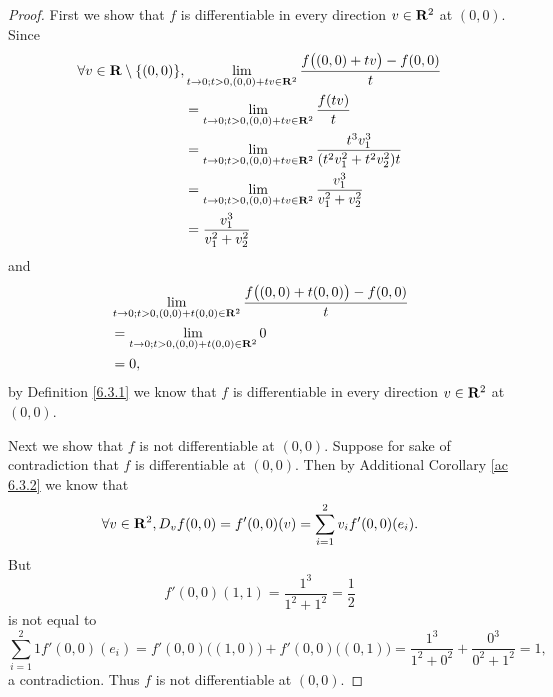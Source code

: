 \begin{proof}
    First we show that \(f\) is differentiable in every direction \(v \in \mathbf{R}^2\) at \((0, 0)\).
    Since
    \begin{align*}
        \forall v \in \mathbf{R} \setminus \{(0, 0)\}, & \lim_{t \to 0 ; t > 0, (0, 0) + tv \in \mathbf{R}^2} \frac{f\big((0, 0) + tv\big) - f(0, 0)}{t}    \\
                                               & = \lim_{t \to 0 ; t > 0, (0, 0) + tv \in \mathbf{R}^2} \frac{f(tv)}{t}                             \\
                                               & = \lim_{t \to 0 ; t > 0, (0, 0) + tv \in \mathbf{R}^2} \frac{t^3 v_1^3}{(t^2 v_1^2 + t^2 v_2^2) t} \\
                                               & = \lim_{t \to 0 ; t > 0, (0, 0) + tv \in \mathbf{R}^2} \frac{v_1^3}{v_1^2 + v_2^2}                 \\
                                               & = \frac{v_1^3}{v_1^2 + v_2^2}
    \end{align*}
    and
    \begin{align*}
         & \lim_{t \to 0 ; t > 0, (0, 0) + t (0, 0) \in \mathbf{R}^2} \frac{f\big((0, 0) + t(0, 0)\big) - f(0, 0)}{t} \\
         & = \lim_{t \to 0 ; t > 0, (0, 0) + t (0, 0) \in \mathbf{R}^2} 0                                             \\
         & = 0,
    \end{align*}
    by Definition \ref{6.3.1} we know that \(f\) is differentiable in every direction \(v \in \mathbf{R}^2\) at \((0, 0)\).

    Next we show that \(f\) is not differentiable at \((0, 0)\).
    Suppose for sake of contradiction that \(f\) is differentiable at \((0, 0)\).
    Then by Additional Corollary \ref{ac 6.3.2} we know that
    \[
        \forall v \in \mathbf{R}^2, D_v f(0, 0) = f'(0, 0)(v) = \sum_{i = 1}^2 v_i f'(0, 0)(e_i).
    \]
    But
    \[
        f'(0, 0)(1, 1) = \frac{1^3}{1^2 + 1^2} = \frac{1}{2}
    \]
    is not equal to
    \[
        \sum_{i = 1}^2 1 f'(0, 0)(e_i) = f'(0, 0)\big((1, 0)\big) + f'(0, 0)\big((0, 1)\big) = \frac{1^3}{1^2 + 0^2} + \frac{0^3}{0^2 + 1^2} = 1,
    \]
    a contradiction.
    Thus \(f\) is not differentiable at \((0, 0)\).


\end{proof}
